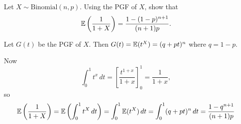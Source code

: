 \begin{exercise}
\begin{questions}
%
%

\question
Let $X\sim\text{Binomial}(n,p)$. Using the PGF of $X$, show that 
\[
\mathbb{E}\left(\frac{1}{1+X}\right) = \frac{1-(1-p)^{n+1}}{(n+1)p}.
\]

\begin{answer}
Let $G(t)$ be the PGF of $X$. Then $G(t)=\mathbb{E}(t^X) = (q+pt)^n$ where $q=1-p$. 

Now
\[
\int_0^1 t^x\,dt = \left[\frac{t^{1+x}}{1+x}\right]_0^1 = \frac{1}{1+x},
\]
so
\[
\mathbb{E}\left(\frac{1}{1+X}\right) 
	= \mathbb{E}\left(\int_0^1 t^X \,dt\right)
	= \int_0^1 \mathbb{E}(t^X)\,dt 
	= \int_0^1 (q+pt)^n\,dt
	= \frac{1-q^{n+1}}{(n+1)p}
\]
\end{answer}


\end{questions}
\end{exercise}
